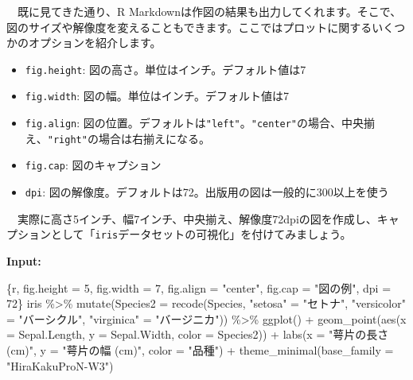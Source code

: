 \documentclass[
  a4paper,
  pandoc,
  ja=standard,
  jafont=haranoaji]{bxjsbook}
\newenvironment{Shaded}{\begin{snugshade}}{\end{snugshade}}
\newcommand{\AttributeTok}[1]{\textcolor[rgb]{0.00,0.48,0.65}{#1}}
\newcommand{\FunctionTok}[1]{\textcolor[rgb]{0.28,0.35,0.67}{#1}}
\newcommand{\InformationTok}[1]{\textcolor[rgb]{0.37,0.37,0.37}{#1}}
\newcommand{\NormalTok}[1]{\textcolor[rgb]{0.00,0.48,0.65}{#1}}
\newcommand{\OtherTok}[1]{\textcolor[rgb]{0.00,0.48,0.65}{#1}}
\newcommand{\SpecialCharTok}[1]{\textcolor[rgb]{0.37,0.37,0.37}{#1}}
\newcommand{\StringTok}[1]{\textcolor[rgb]{0.13,0.47,0.30}{#1}}
\providecommand{\tightlist}{%
  \setlength{\itemsep}{0pt}\setlength{\parskip}{0pt}}
\begin{document}
　既に見てきた通り、R
Markdownは作図の結果も出力してくれます。そこで、図のサイズや解像度を変えることもできます。ここではプロットに関するいくつかのオプションを紹介します。

\begin{itemize}
\tightlist
\item
  \texttt{fig.height}: 図の高さ。単位はインチ。デフォルト値は7
\item
  \texttt{fig.width}: 図の幅。単位はインチ。デフォルト値は7
\item
  \texttt{fig.align}:
  図の位置。デフォルトは\texttt{"left"}。\texttt{"center"}の場合、中央揃え、\texttt{"right"}の場合は右揃えになる。
\item
  \texttt{fig.cap}: 図のキャプション
\item
  \texttt{dpi}:
  図の解像度。デフォルトは72。出版用の図は一般的に300以上を使う
\end{itemize}

　実際に高さ5インチ、幅7インチ、中央揃え、解像度72dpiの図を作成し、キャプションとして「\texttt{iris}データセットの可視化」を付けてみましょう。

\textbf{Input:} 　

\begin{Shaded}
\begin{Highlighting}[]
\InformationTok{\textasciigrave{}\textasciigrave{}\textasciigrave{}\{r, fig.height = 5, fig.width = 7, fig.align = "center", fig.cap = "図の例", dpi = 72\}}
\NormalTok{iris }\SpecialCharTok{\%\textgreater{}\%}
  \FunctionTok{mutate}\NormalTok{(}\AttributeTok{Species2 =} \FunctionTok{recode}\NormalTok{(Species,}
                           \StringTok{"setosa"}     \OtherTok{=} \StringTok{"セトナ"}\NormalTok{,}
                           \StringTok{"versicolor"} \OtherTok{=} \StringTok{"バーシクル"}\NormalTok{,}
                           \StringTok{"virginica"}  \OtherTok{=} \StringTok{"バージニカ"}\NormalTok{)) }\SpecialCharTok{\%\textgreater{}\%}
  \FunctionTok{ggplot}\NormalTok{() }\SpecialCharTok{+}
  \FunctionTok{geom\_point}\NormalTok{(}\FunctionTok{aes}\NormalTok{(}\AttributeTok{x =}\NormalTok{ Sepal.Length, }\AttributeTok{y =}\NormalTok{ Sepal.Width, }\AttributeTok{color =}\NormalTok{ Species2)) }\SpecialCharTok{+}
  \FunctionTok{labs}\NormalTok{(}\AttributeTok{x =} \StringTok{"萼片の長さ (cm)"}\NormalTok{, }\AttributeTok{y =} \StringTok{"萼片の幅 (cm)"}\NormalTok{, }\AttributeTok{color =} \StringTok{"品種"}\NormalTok{) }\SpecialCharTok{+}
  \FunctionTok{theme\_minimal}\NormalTok{(}\AttributeTok{base\_family =} \StringTok{"HiraKakuProN{-}W3"}\NormalTok{)}
\InformationTok{\textasciigrave{}\textasciigrave{}\textasciigrave{}}
\end{Highlighting}
\end{Shaded}
\end{document}
